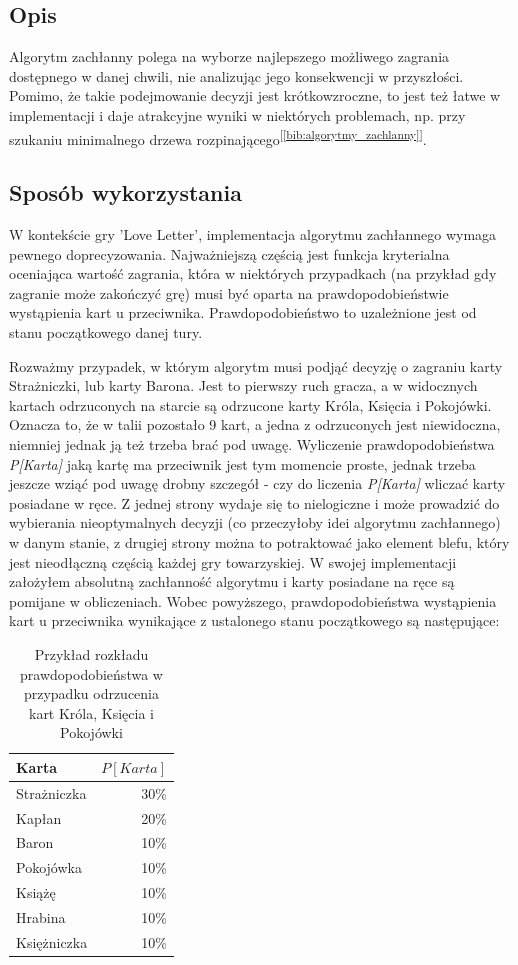 \subsection{Opis}
Algorytm zachłanny polega na wyborze najlepszego możliwego zagrania dostępnego w danej chwili, nie analizując jego konsekwencji w przyszłości. Pomimo, że takie podejmowanie decyzji jest krótkowzroczne, to jest też łatwe w implementacji i daje atrakcyjne wyniki w niektórych problemach, np. przy szukaniu minimalnego drzewa rozpinającego\textsuperscript{[\ref{bib:algorytmy_zachlanny}]}.

\subsection{Sposób wykorzystania}

W kontekście gry 'Love Letter', implementacja algorytmu zachłannego wymaga pewnego doprecyzowania. Najważniejszą częścią jest funkcja kryterialna oceniająca wartość zagrania, która w niektórych przypadkach (na przykład gdy zagranie może zakończyć grę) musi być oparta na prawdopodobieństwie wystąpienia kart u przeciwnika. Prawdopodobieństwo to uzależnione jest od stanu początkowego danej tury.

Rozważmy przypadek, w którym algorytm musi podjąć decyzję o zagraniu karty Strażniczki, lub karty Barona. Jest to pierwszy ruch gracza, a w widocznych kartach odrzuconych na starcie są odrzucone karty Króla, Księcia i Pokojówki. Oznacza to, że w talii pozostało 9 kart, a jedna z odrzuconych jest niewidoczna, niemniej jednak ją też trzeba brać pod uwagę. Wyliczenie prawdopodobieństwa \textit{P[Karta]} jaką kartę ma przeciwnik jest tym momencie proste, jednak trzeba jeszcze wziąć pod uwagę drobny szczegół - czy do liczenia \textit{P[Karta]} wliczać karty posiadane w ręce. Z jednej strony wydaje się to nielogiczne i może prowadzić do wybierania nieoptymalnych decyzji (co przeczyłoby idei algorytmu zachłannego) w danym stanie, z drugiej strony można to potraktować jako element blefu, który jest nieodłączną częścią każdej gry towarzyskiej. W swojej implementacji założyłem absolutną zachłanność algorytmu i karty posiadane na ręce są pomijane w obliczeniach. 
Wobec powyższego, prawdopodobieństwa wystąpienia kart u przeciwnika wynikające z ustalonego stanu początkowego są następujące:

\begin{table}[h]
	\caption{Przykład rozkładu prawdopodobieństwa w przypadku odrzucenia kart Króla, Księcia i Pokojówki}
	\centering
		\begin{tabular}{|l|r|}
			\hline
			\bf{Karta} & $P[Karta]$	\\ \hline
			Strażniczka & 30\% 			\\ \hline
			Kapłan & 20\% 				\\ \hline
			Baron & 10\% 				\\ \hline
			Pokojówka & 10\% 			\\ \hline
			Książę & 10\% 				\\ \hline
			Hrabina & 10\% 				\\ \hline
			Księżniczka & 10\% 			\\ \hline
		\end{tabular}
\end{table}

